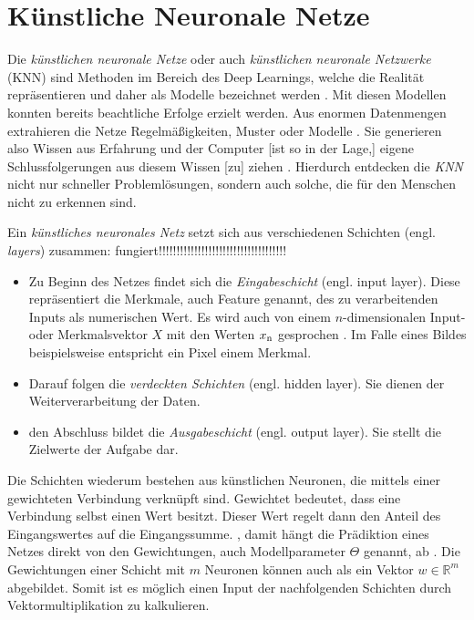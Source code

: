 \section{Künstliche Neuronale Netze}
\label{KNN}

Die \textit{künstlichen neuronale Netze} oder auch \textit{künstlichen neuronale Netzwerke} (KNN) sind Methoden im Bereich des Deep Learnings, welche die Realität repräsentieren und daher als Modelle bezeichnet werden \cite[vlg.][S. 40]{13}. Mit diesen Modellen konnten bereits beachtliche Erfolge erzielt werden. Aus enormen Datenmengen extrahieren die Netze \glqq Regelmäßigkeiten, Muster oder Modelle\grqq{} \cite[S. 40]{13}. 
Sie generieren also \glqq Wissen aus Erfahrung\grqq{} \cite[S. 40]{13} und \glqq der Computer [ist so in der Lage,] eigene Schlussfolgerungen aus diesem Wissen [zu] ziehen\grqq{} \cite[S. 33]{12}.
Hierdurch entdecken die \textit{KNN} nicht nur schneller Problemlösungen, sondern auch solche, die für den Menschen nicht zu erkennen sind. \cite[vgl.][S. 40]{13}

Ein \textit{künstliches neuronales Netz} setzt sich aus verschiedenen Schichten (engl. \textit{layers}) zusammen:
fungiert!!!!!!!!!!!!!!!!!!!!!!!!!!!!!!!!!!!!
\begin{itemize}
	\item Zu Beginn des Netzes findet sich die \textit{Eingabeschicht} (engl. input layer). Diese repräsentiert die Merkmale, auch Feature genannt, des zu verarbeitenden Inputs als numerischen Wert. Es wird auch von einem $n$-dimensionalen Input- oder Merkmalsvektor $X$ mit den Werten $x\textsubscript{n}$ gesprochen \cite[vlg.][S.176]{14}. Im Falle eines Bildes beispielsweise entspricht ein Pixel einem Merkmal.
	\item Darauf folgen die \textit{verdeckten Schichten} (engl. hidden layer). Sie dienen der Weiterverarbeitung der Daten.
	\item den Abschluss bildet die \textit{Ausgabeschicht} (engl. output layer). Sie stellt die Zielwerte der Aufgabe dar. \\
	\cite[vgl. ][S.72]{12}
\end{itemize}
Die Schichten wiederum bestehen aus künstlichen Neuronen, die mittels einer gewichteten Verbindung verknüpft sind. Gewichtet bedeutet, dass eine Verbindung selbst einen Wert besitzt. Dieser Wert regelt dann \glqq den Anteil des Eingangswertes auf die Eingangssumme.\grqq{} \cite[S. 28]{13}, damit hängt die Prädiktion eines Netzes direkt von den Gewichtungen, auch Modellparameter $\Theta$ genannt, ab \cite[vgl.][S. 77]{12}. Die Gewichtungen einer Schicht mit $m$ Neuronen können auch als ein Vektor $w \in \mathbb{R}^m$ abgebildet. Somit ist es möglich einen Input der nachfolgenden Schichten durch Vektormultiplikation zu kalkulieren.


